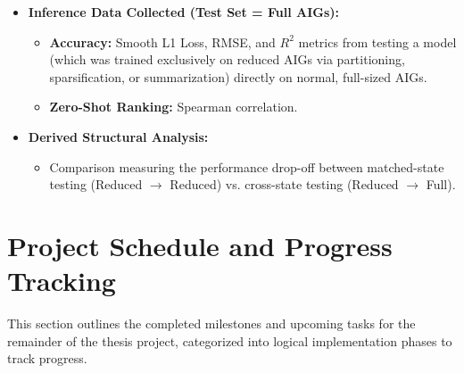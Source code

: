 \documentclass[paper=a4, fontsize=11pt]{scrartcl} %
\numberwithin{equation}{section} %
\numberwithin{figure}{section} %
\numberwithin{table}{section} %
\begin{document}
\begin{itemize}
    \item \textbf{Inference Data Collected (Test Set = Full AIGs):}
    \begin{itemize}
        \item \textbf{Accuracy:} Smooth L1 Loss, RMSE, and $R^2$ metrics from testing a model (which was trained exclusively on reduced AIGs via partitioning, sparsification, or summarization) directly on normal, full-sized AIGs.
        \item \textbf{Zero-Shot Ranking:} Spearman correlation.
    \end{itemize}
    \item \textbf{Derived Structural Analysis:} 
    \begin{itemize}
        \item Comparison measuring the performance drop-off between matched-state testing (Reduced $\rightarrow$ Reduced) vs. cross-state testing (Reduced $\rightarrow$ Full).
    \end{itemize}
\end{itemize}

\section{Project Schedule and Progress Tracking}
This section outlines the completed milestones and upcoming tasks for the remainder of the thesis project, categorized into logical implementation phases to track progress.
\end{document}
